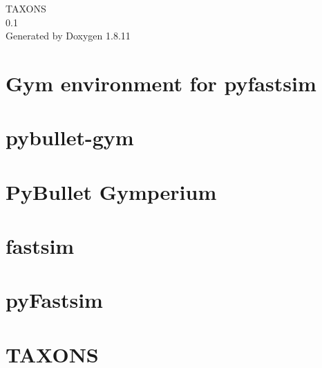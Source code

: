 \documentclass[twoside]{book}
\newcommand{\+}{\discretionary{\mbox{\scriptsize$\hookleftarrow$}}{}{}}
\newcommand{\clearemptydoublepage}{%
  \newpage{\pagestyle{empty}\cleardoublepage}%
}
\begin{document}
\hypersetup{pageanchor=false,
             bookmarksnumbered=true,
             pdfencoding=unicode
            }
\begin{titlepage}
\vspace*{7cm}
\begin{center}%
{\Large T\+A\+X\+O\+NS \\[1ex]\large 0.\+1 }\\
\vspace*{1cm}
{\large Generated by Doxygen 1.8.11}\\
\end{center}
\end{titlepage}
\clearemptydoublepage
\tableofcontents
\clearemptydoublepage
{}
\hypersetup{pageanchor=true}

\chapter{Gym environment for pyfastsim}
\label{md_external_fastsim_gym_README}
\hypertarget{md_external_fastsim_gym_README}{}

\chapter{pybullet-\/gym}
\label{md_external_pybullet-gym_LICENSE}
\hypertarget{md_external_pybullet-gym_LICENSE}{}

\chapter{Py\+Bullet Gymperium}
\label{md_external_pybullet-gym_README}
\hypertarget{md_external_pybullet-gym_README}{}

\chapter{fastsim}
\label{md_external_pyfastsim_libfastsim_README}
\hypertarget{md_external_pyfastsim_libfastsim_README}{}

\chapter{py\+Fastsim}
\label{md_external_pyfastsim_README}
\hypertarget{md_external_pyfastsim_README}{}

\chapter{T\+A\+X\+O\+NS}
\label{md_README}
\hypertarget{md_README}{}

\end{document}
